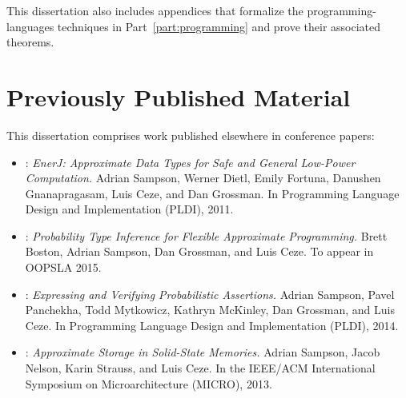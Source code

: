 This dissertation also includes appendices that formalize the
programming-languages techniques in Part~\ref{part:programming} and prove
their associated theorems.


\section{Previously Published Material}

This dissertation comprises work published elsewhere in conference papers:

\begin{itemize}
\item {}:
\textit{EnerJ: Approximate Data Types for Safe and General Low-Power
Computation.}
Adrian Sampson, Werner Dietl, Emily Fortuna, Danushen Gnanapragasam, Luis Ceze, and Dan Grossman.
In Programming Language Design and Implementation (PLDI), 2011.
\cite{enerj}

\item {}:
\textit{Probability Type Inference for Flexible Approximate Programming.}
Brett Boston, Adrian Sampson, Dan Grossman, and Luis Ceze.
To appear in OOPSLA 2015.
\cite{decaf}

\item {}:
\textit{Expressing and Verifying Probabilistic Assertions.}
Adrian Sampson, Pavel Panchekha, Todd Mytkowicz, Kathryn McKinley, Dan Grossman, and Luis Ceze.
In Programming Language Design and Implementation (PLDI), 2014.
\cite{passert}

\item {}:
\textit{Approximate Storage in Solid-State Memories.}
Adrian Sampson, Jacob Nelson, Karin Strauss, and Luis Ceze.
In the IEEE/ACM International Symposium on Microarchitecture (MICRO), 2013.
\cite{approxstorage}
\end{itemize}
